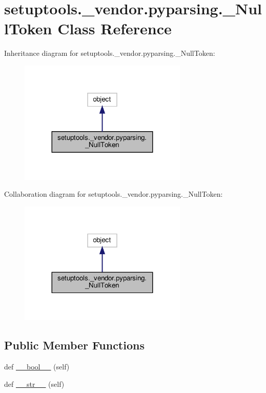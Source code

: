 \hypertarget{classsetuptools_1_1__vendor_1_1pyparsing_1_1__NullToken}{}\section{setuptools.\+\_\+vendor.\+pyparsing.\+\_\+\+Null\+Token Class Reference}
\label{classsetuptools_1_1__vendor_1_1pyparsing_1_1__NullToken}


Inheritance diagram for setuptools.\+\_\+vendor.\+pyparsing.\+\_\+\+Null\+Token\+:
\nopagebreak
\begin{figure}[H]
\begin{center}
\leavevmode
\includegraphics[width=227pt]{classsetuptools_1_1__vendor_1_1pyparsing_1_1__NullToken__inherit__graph}
\end{center}
\end{figure}


Collaboration diagram for setuptools.\+\_\+vendor.\+pyparsing.\+\_\+\+Null\+Token\+:
\nopagebreak
\begin{figure}[H]
\begin{center}
\leavevmode
\includegraphics[width=227pt]{classsetuptools_1_1__vendor_1_1pyparsing_1_1__NullToken__coll__graph}
\end{center}
\end{figure}
\subsection*{Public Member Functions}
\begin{DoxyCompactItemize}
\item 
def \hyperlink{classsetuptools_1_1__vendor_1_1pyparsing_1_1__NullToken_a27494b6079703fa74e406036865a6a20}{\+\_\+\+\_\+bool\+\_\+\+\_\+} (self)
\item 
def \hyperlink{classsetuptools_1_1__vendor_1_1pyparsing_1_1__NullToken_abeb86c8240d0dc2fcc7a559dc21b0f3b}{\+\_\+\+\_\+str\+\_\+\+\_\+} (self)
\end{DoxyCompactItemize}


